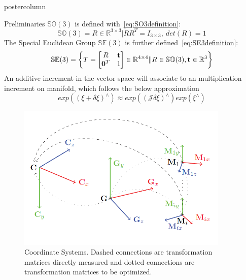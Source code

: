 \documentclass{beamer}
\begin{document}
\begin{frame}
\begin{columns}
\begin{column}{.4\textwidth}
\begin{beamercolorbox}[center]{postercolumn}
\begin{minipage}{.98\textwidth}
{\begin{block}{Preliminaries}
$\mathbb{SO}(3)$ is defined with~\eqref{eq:SO3definition}:
\begin{equation}
\mathbb{SO}(3)={{R} \in \mathbb{R}^{3 \times 3}|RR^T={I_{3 \times 3}},\ det({R})=1}
\label{eq:SO3definition}
\end{equation}
The Special Euclidean Group $\mathbb{SE}(3)$ is further defined~\eqref{eq:SE3definition}:
\begin{equation}
\mathbb{SE}(3)=\left\lbrace
{T}=\left[
\begin{matrix} 
{R} & \bold{t} \\
\bold{0}^T & 1
\end{matrix}
\right] \in \mathbb{R}^{4 \times 4} \| {{R} \in \mathbb{SO}(3), \bold{t}} 
 \in \mathbb{R}^3 \right\rbrace
\label{eq:SE3definition}
\end{equation}
%
An additive increment in the vector space will associate to an multiplication increment on manifold, which follows the below approximation
\begin{equation}
\label{eq:manifoldapprox}
exp((\mathbb{\xi}+\delta \mathbb{\xi})^{\land}) \approx exp((\mathcal{J}\delta\mathbb{\xi}) ^{\land})exp(\mathbb{\xi}^{\land})
\end{equation}
\vspace{0.4em}
						\begin{figure}
							\begin{minipage}{0.43\textwidth}
								\centering						\includegraphics[width=0.9\textwidth]{img/coor.png}
                  	\caption{Coordinate Systems. Dashed connections are transformation matrices directly measured and dotted connections are transformation matrices to be optimized.}
							\end{minipage}
							\hspace{1em}

\end{figure}
\end{block}}
\end{minipage}
\end{beamercolorbox}
\end{column}
\end{columns}
\end{frame}
\end{document}
